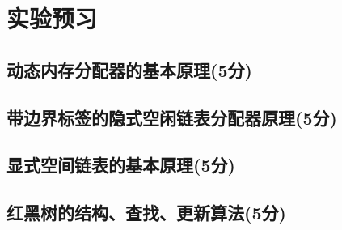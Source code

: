 \section{实验预习}
\subsection{动态内存分配器的基本原理(5分)}

\subsection{带边界标签的隐式空闲链表分配器原理(5分)}

\subsection{显式空间链表的基本原理(5分)}

\subsection{红黑树的结构、查找、更新算法(5分)}

